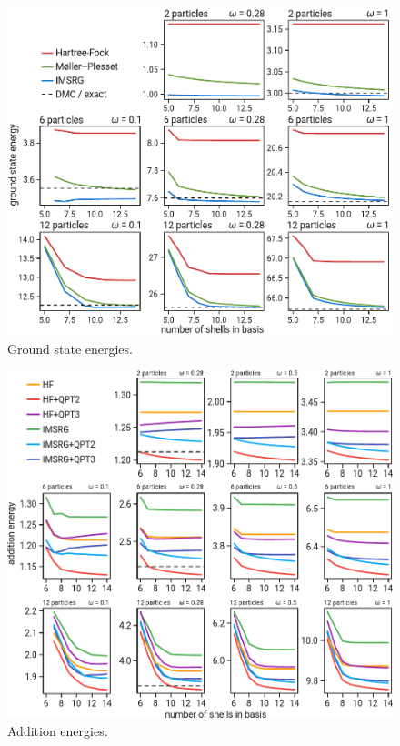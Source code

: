 \begin{figure}
  \centering
  \includegraphics[width=0.8\linewidth]{fig-gs}
  \caption{Ground state energies.}
  \label{fig:gs}
\end{figure}

\begin{figure}
  \centering
  \includegraphics[width=0.8\linewidth]{fig-add}
  \caption{Addition energies.}
  \label{fig:add}
\end{figure}

